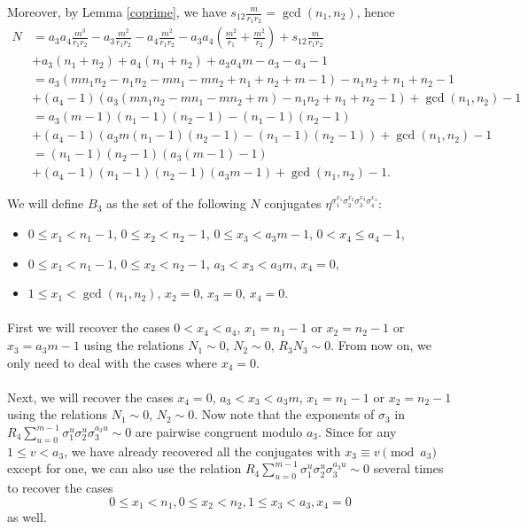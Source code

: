 Moreover, by Lemma \ref{coprime}, we have $s_{12}\frac{m}{r_1r_2}=\gcd(n_1,n_2)$, hence
\begin{align*}
N&=a_3a_4\frac{m^3}{r_1r_2}-a_3\frac{m^2}{r_1r_2}-a_4\frac{m^2}{r_1r_2}-a_3a_4\left(\frac{m^2}{r_1}+\frac{m^2}{r_2}\right)+s_{12}\frac{m}{r_1r_2}\\
&+a_3(n_1+n_2)+a_4(n_1+n_2)+a_3a_4m-a_3-a_4-1\\
&=a_3\left(mn_1n_2-n_1n_2 -mn_1-mn_2+n_1+n_2+m-1\right)-n_1n_2+n_1+n_2-1\\
&+(a_4-1)(a_3\left(mn_1n_2 -mn_1-mn_2+m\right)-n_1n_2+n_1+n_2-1)+\gcd(n_1,n_2)-1\\
&=a_3\left(m-1\right)\left(n_1-1\right)\left(n_2-1\right)-\left(n_1-1\right)\left(n_2-1\right)\\
&+(a_4-1)\left(a_3m\left(n_1-1\right)\left(n_2-1\right)-\left(n_1-1\right)\left(n_2-1\right)\right)+\gcd(n_1,n_2)-1\\
&=(n_1-1)(n_2-1)(a_3(m-1)-1)\\
&+(a_4-1)(n_1-1)(n_2-1)(a_3m-1)+\gcd(n_1,n_2)-1.
\end{align*}

We will define $B_3$ as the set of the following $N$ conjugates $\eta^{\sigma_1^{x_1}\sigma_2^{x_2}\sigma_3^{x_3}\sigma_4^{x_4}}$:
\begin{itemize}
\item $0\leq x_1<n_1-1$, $ 0\leq x_2<n_2-1$, $ 0\leq x_3<a_3m-1$, $ 0<x_4\leq a_4-1$,
\item $0\leq x_1<n_1-1$, $ 0\leq x_2<n_2-1$, $ a_3<x_3<a_3m$, $ x_4=0,$
\item $1\leq x_1<\gcd(n_1,n_2)$, $ x_2=0$, $ x_3=0$, $x_4=0$.
\end{itemize}

\paragraph*{}
First we will recover the cases $0<x_4<a_4$, $x_1=n_1-1$ or $x_2=n_2-1$ or $x_3=a_3m-1$ using the relations $N_1\sim 0$, $ N_2\sim 0$, $ R_3N_3\sim 0$. From now on, we only need to deal with the cases where $x_4=0$.
\paragraph*{}
Next, we will recover the cases $x_4=0$, $a_3< x_3<a_3m$, $x_1=n_1-1$ or $x_2=n_2-1$ using the relations $N_1\sim 0$, $ N_2\sim 0$. Now note that the exponents of $\sigma_3$ in $R_4\sum_{u=0}^{m-1}\sigma_1^{u}\sigma_2^{u}\sigma_3^{a_3u}\sim 0$ are pairwise congruent modulo $a_3$. Since for any $1\leq v<a_3$, we have already recovered all the conjugates with $x_3\equiv v \pmod{a_3}$ except for one, we can also use the relation $R_4\sum_{u=0}^{m-1}\sigma_1^{u}\sigma_2^{u}\sigma_3^{a_3u}\sim 0$ several times to recover the cases $$0\leq x_1<n_1, 0\leq x_2< n_2, 1\leq x_3<a_3, x_4=0$$ as well.
